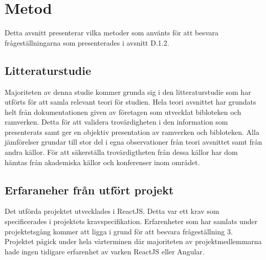 \section{Metod}
\label{sec:axel-method}

Detta avsnitt presenterar vilka metoder som använts för att besvara frågeställningarna som presenterades i avsnitt D.1.2.

\subsection{Litteraturstudie}
Majoriteten av denna studie kommer grunda sig i den litteraturstudie som har utförts för att samla relevant teori för studien. Hela teori avsnittet har grundats helt från dokumentationen given av företagen som utvecklat bibloteken och ramverken. Detta för att validera trovärdigheten i den information som presenterats samt ger en objektiv presentation av ramverken och bibloteken. Alla jämförelser grundar till stor del i egna observationer från teori avsnittet samt från andra källor. För att säkerställa trovärdigtheten från dessa källor har dom hämtas från akademiska källor och konferenser inom området.

\subsection{Erfaraneher från utfört projekt}
Det utförda projektet utvecklades i ReactJS. Detta var ett krav som specificerades i projektets kravspecifikation. Erfarenheter som har samlats under projektetsgång kommer att ligga i grund för att besvara frågeställning 3. Projektet pågick under hela vårterminen där majoriteten av projektmedlemmarna hade ingen tidigare erfarenhet av varken ReactJS eller Angular.
